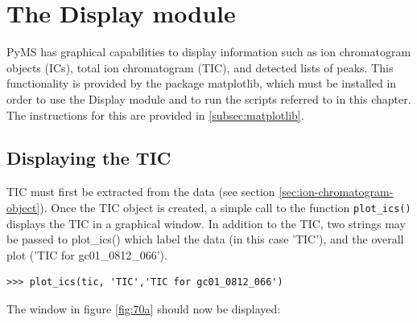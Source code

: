 

\chapter{The Display module}

PyMS has graphical capabilities to display information such as ion chromatogram
objects (ICs), total ion chromatogram (TIC), and detected lists of peaks.
This functionality is provided by the package matplotlib, which must be installed
in order to use the Display module and to run the scripts referred to in this
chapter. The instructions for this are provided in \ref{subsec:matplotlib}.

\section{Displaying the TIC}
\label{sec:display-tic}

TIC must first be extracted from the data (see section
\ref{sec:ion-chromatogram-object}).  Once the TIC object is created,
a simple call to the function {\tt plot\_ics()} displays the TIC in a
graphical window. In addition to the TIC, two strings may be passed
to plot\_ics() which label the data (in this case 'TIC'), and the
overall plot ('TIC for gc01\_0812\_066').

\begin{verbatim}
>>> plot_ics(tic, 'TIC','TIC for gc01_0812_066')
\end{verbatim}

The window in figure \ref{fig:70a} should now be displayed:

